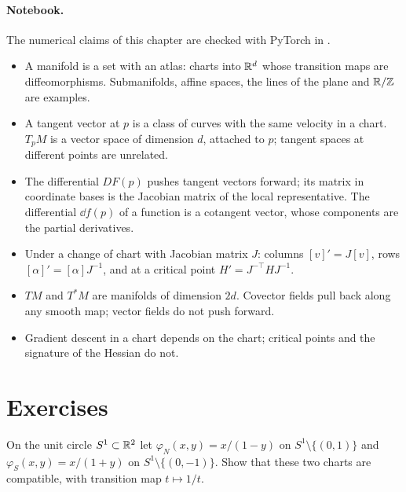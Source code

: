 \begin{notechapter}
\paragraph{Notebook.} The numerical claims of this chapter are checked
with PyTorch in .

\begin{chaptersummary}
\begin{itemize}[nosep]
  \item A manifold is a set with an atlas: charts into $\mathbb{R}^d$ whose
        transition maps are diffeomorphisms. Submanifolds, affine spaces,
        the lines of the plane and $\mathbb{R}/\mathbb{Z}$ are examples.
  \item A tangent vector at $p$ is a class of curves with the same
        velocity in a chart. $T_pM$ is a vector space of dimension $d$,
        attached to $p$; tangent spaces at different points are
        unrelated.
  \item The differential $DF(p)$ pushes tangent vectors forward; its
        matrix in coordinate bases is the Jacobian matrix of the local
        representative. The differential $\dd f(p)$ of a function is a
        cotangent vector, whose components are the partial derivatives.
  \item Under a change of chart with Jacobian matrix $J$: columns
        $[v]' = J[v]$, rows $[\alpha]' = [\alpha]J^{-1}$, and at a
        critical point $H' = J^{-\top}HJ^{-1}$.
  \item $TM$ and $T^*M$ are manifolds of dimension $2d$. Covector fields
        pull back along any smooth map; vector fields do not push
        forward.
  \item Gradient descent in a chart depends on the chart; critical points
        and the signature of the Hessian do not.
\end{itemize}
\end{chaptersummary}

\section*{Exercises}

\begin{exercise}\label{tangent-bundles:exr:1}
On the unit circle $S^1\subset\mathbb{R}^2$ let
$\varphi_N(x, y) = x/(1 - y)$ on $S^1\setminus\{(0, 1)\}$ and
$\varphi_S(x, y) = x/(1 + y)$ on $S^1\setminus\{(0, -1)\}$. Show that
these two charts are compatible, with transition map $t\mapsto1/t$.
\end{exercise}


\end{notechapter}
